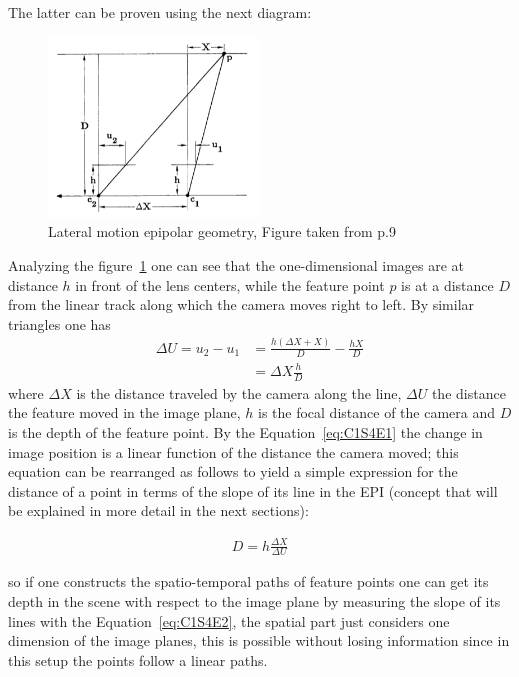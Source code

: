The latter can be proven using the next diagram:

\begin{figure}[h!]
\centering
\includegraphics[width= 0.50\textwidth]{./Diagrams/stereo-dist.jpg}
\caption{Lateral motion epipolar geometry, Figure taken from \cite{Bolles} p.9}
\label{fig:LateralMotion}
\end{figure}

Analyzing the figure~\ref{fig:LateralMotion} one can see that the one-dimensional images are at distance $h$ in front of the lens centers, while the feature point $p$ is at a distance $D$ from the linear track along which the camera moves right to left. By similar triangles one has
\begin{equation}
\label{eq:C1S4E1}
\begin{aligned}
\Delta U = u_2-u_1 &= \frac{h(\Delta X+X)}{D}-\frac{hX}{D}\\
                   &= \Delta X\frac{h}{D}
\end{aligned}
\end{equation}
where $\Delta X$ is the distance traveled by the camera along the line, $\Delta U$ the distance the feature moved in the image plane, $h$ is the focal distance of the camera and $D$ is the depth of the feature point. By the Equation~\ref{eq:C1S4E1} the change in image position is a linear function of the distance the camera moved; this equation can be rearranged as follows to yield a simple expression for the distance of a point in terms of the slope of its line in the EPI (concept that will be explained in more detail in the next sections):

\begin{equation}
\label{eq:C1S4E2}
\begin{aligned}
D = h\frac{\Delta X}{\Delta U}
\end{aligned}
\end{equation}

so if one constructs the spatio-temporal paths of feature points one can get its depth in the scene with respect to the image plane by measuring the slope of its lines with the Equation~\ref{eq:C1S4E2}, the spatial part just considers one dimension of the image planes, this is possible without losing information since in this setup the points follow a linear paths.

